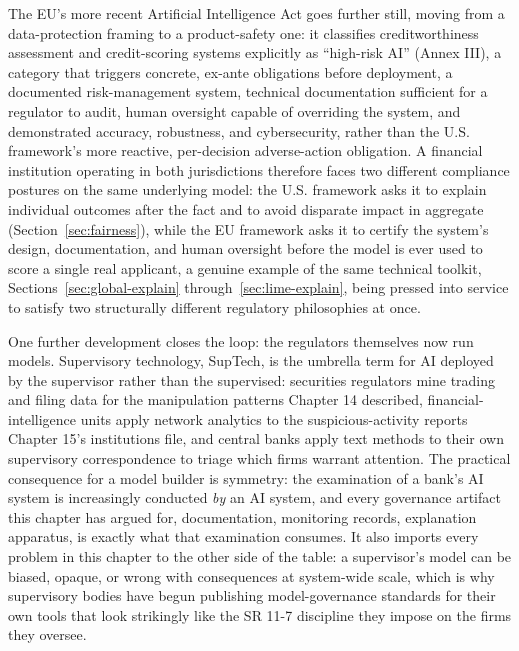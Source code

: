 \documentclass[../ai_in_finance]{subfiles}
\begin{document}
The EU's more recent Artificial Intelligence Act goes further still, moving from a data-protection framing to a product-safety one: it classifies creditworthiness assessment and credit-scoring systems explicitly as ``high-risk AI'' (Annex III), a category that triggers concrete, ex-ante obligations before deployment, a documented risk-management system, technical documentation sufficient for a regulator to audit, human oversight capable of overriding the system, and demonstrated accuracy, robustness, and cybersecurity, rather than the U.S. framework's more reactive, per-decision adverse-action obligation. A financial institution operating in both jurisdictions therefore faces two different compliance postures on the same underlying model: the U.S. framework asks it to explain individual outcomes after the fact and to avoid disparate impact in aggregate (Section~\ref{sec:fairness}), while the EU framework asks it to certify the system's design, documentation, and human oversight before the model is ever used to score a single real applicant, a genuine example of the same technical toolkit, Sections~\ref{sec:global-explain} through~\ref{sec:lime-explain}, being pressed into service to satisfy two structurally different regulatory philosophies at once.

One further development closes the loop: the regulators themselves now run models. Supervisory technology, SupTech, is the umbrella term for AI deployed by the supervisor rather than the supervised: securities regulators mine trading and filing data for the manipulation patterns Chapter 14 described, financial-intelligence units apply network analytics to the suspicious-activity reports Chapter 15's institutions file, and central banks apply text methods to their own supervisory correspondence to triage which firms warrant attention. The practical consequence for a model builder is symmetry: the examination of a bank's AI system is increasingly conducted \emph{by} an AI system, and every governance artifact this chapter has argued for, documentation, monitoring records, explanation apparatus, is exactly what that examination consumes. It also imports every problem in this chapter to the other side of the table: a supervisor's model can be biased, opaque, or wrong with consequences at system-wide scale, which is why supervisory bodies have begun publishing model-governance standards for their own tools that look strikingly like the SR 11-7 discipline they impose on the firms they oversee.
\end{document}
